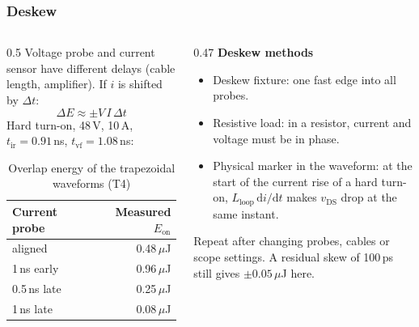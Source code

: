 \begin{frame}
	\frametitle{Deskew}
	\begin{columns}[T]
		\begin{column}{0.5\textwidth}
			\small
			Voltage probe and current sensor have different delays (cable length, amplifier). If $i$ is shifted by $\Delta t$:
			\begin{equation*}
				\Delta E\approx\pm V\,I\,\Delta t
			\end{equation*}
			Hard turn-on, 48\,V, 10\,A, $t_\mathrm{ir}=0.91$\,ns, $t_\mathrm{vf}=1.08$\,ns:
			\begin{table}
				\centering
				\footnotesize
				\begin{tabular}{|l|r|}
					\hline
					\textbf{Current probe}   & \textbf{Measured $E_\mathrm{on}$} \\
					\hline
					aligned                  & 0.48\,$\mu$J                      \\
					1\,ns early              & 0.96\,$\mu$J                      \\
					0.5\,ns late             & 0.25\,$\mu$J                      \\
					1\,ns late               & 0.08\,$\mu$J                      \\
					\hline
				\end{tabular}
				\caption{Overlap energy of the trapezoidal waveforms (T4)}
			\end{table}
		\end{column}
		\begin{column}{0.47\textwidth}
			\small
			\textbf{Deskew methods}
			\begin{itemize}
				\item Deskew fixture: one fast edge into all probes.
				\item Resistive load: in a resistor, current and voltage must be in phase.
				\item Physical marker in the waveform: at the start of the current rise of a hard turn-on, $L_\mathrm{loop}\,\mathrm{d}i/\mathrm{d}t$ makes $v_\mathrm{DS}$ drop at the same instant.
			\end{itemize}
			Repeat after changing probes, cables or scope settings. A residual skew of 100\,ps still gives $\pm0.05\,\mu$J here.
		\end{column}
	\end{columns}
\end{frame}

